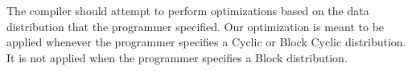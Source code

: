 The compiler should attempt to perform optimizations based on the data distribution that the programmer specified. Our optimization is meant to be applied whenever the programmer specifies a Cyclic or Block Cyclic distribution. It is not applied when the programmer specifies a Block distribution.

